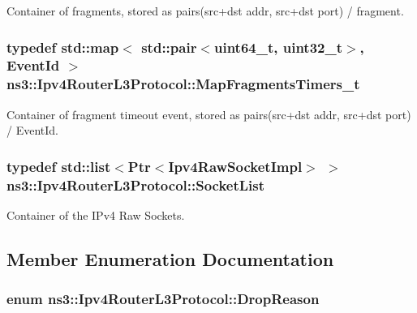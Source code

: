 Container of fragments, stored as pairs(src+dst addr, src+dst port) / fragment. 

\hypertarget{classns3_1_1Ipv4RouterL3Protocol_a1b7e366a2a7bbb1336aacaca4af8997b}{
\subsubsection[{Map\-Fragments\-Timers\-\_\-t}]{\setlength{\rightskip}{0pt plus 5cm}typedef std\-::map$<$ std\-::pair$<$uint64\-\_\-t, uint32\-\_\-t$>$, Event\-Id $>$ {\bf ns3\-::\-Ipv4\-Router\-L3\-Protocol\-::\-Map\-Fragments\-Timers\-\_\-t}\hspace{0.3cm}{\ttfamily [private]}}}\label{classns3_1_1Ipv4RouterL3Protocol_a1b7e366a2a7bbb1336aacaca4af8997b}


Container of fragment timeout event, stored as pairs(src+dst addr, src+dst port) / Event\-Id. 

\hypertarget{classns3_1_1Ipv4RouterL3Protocol_aeaeda330ab6a6f6d7cf4392024f4dc8e}{
\subsubsection[{Socket\-List}]{\setlength{\rightskip}{0pt plus 5cm}typedef std\-::list$<$Ptr$<$Ipv4\-Raw\-Socket\-Impl$>$ $>$ {\bf ns3\-::\-Ipv4\-Router\-L3\-Protocol\-::\-Socket\-List}\hspace{0.3cm}{\ttfamily [private]}}}\label{classns3_1_1Ipv4RouterL3Protocol_aeaeda330ab6a6f6d7cf4392024f4dc8e}


Container of the I\-Pv4 Raw Sockets. 



\subsection{Member Enumeration Documentation}
\hypertarget{classns3_1_1Ipv4RouterL3Protocol_a050d08aa42fe2c3f9c133a263e121fcd}{
\subsubsection[{Drop\-Reason}]{\setlength{\rightskip}{0pt plus 5cm}enum {\bf ns3\-::\-Ipv4\-Router\-L3\-Protocol\-::\-Drop\-Reason}}}\label{classns3_1_1Ipv4RouterL3Protocol_a050d08aa42fe2c3f9c133a263e121fcd}


